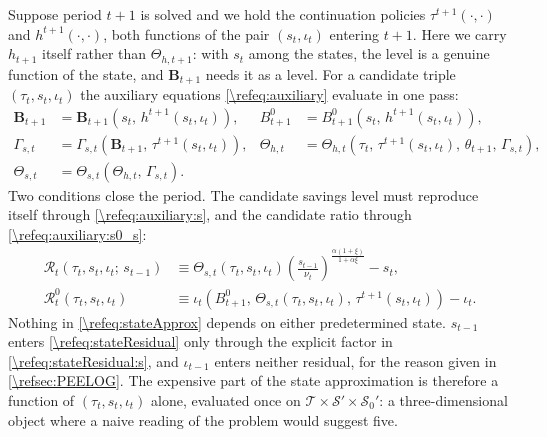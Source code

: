 Suppose period $t+1$ is solved and we hold the continuation policies $\tau^{t+1}(\cdot,\cdot)$ and $h^{t+1}(\cdot,\cdot)$, both functions of the pair $(s_t,\iota_t)$ entering $t+1$. Here we carry $h_{t+1}$ itself rather than $\Theta_{h,t+1}$: with $s_t$ among the states, the level is a genuine function of the state, and $\bm{B}_{t+1}$ needs it as a level. For a candidate triple $(\tau_t, s_t, \iota_t)$ the auxiliary equations \eqref{\refeq:auxiliary} evaluate in one pass:
\begin{subequations}\label{\refeq:stateApprox}
\begin{align}
    \bm{B}_{t+1} &= \bm{B}_{t+1}\left(s_t,\, h^{t+1}(s_t,\iota_t)\right), & B_{t+1}^0 &= B_{t+1}^0\left(s_t,\, h^{t+1}(s_t,\iota_t)\right), \label{\refeq:stateApprox:B}\\
    \Gamma_{s,t} &= \Gamma_{s,t}\left(\bm{B}_{t+1},\, \tau^{t+1}(s_t,\iota_t)\right), &
    \Theta_{h,t} &= \Theta_{h,t}\left(\tau_t,\, \tau^{t+1}(s_t,\iota_t),\, \theta_{t+1},\, \Gamma_{s,t}\right), \label{\refeq:stateApprox:Gammas}\\
    \Theta_{s,t} &= \Theta_{s,t}\left(\Theta_{h,t},\, \Gamma_{s,t}\right). \label{\refeq:stateApprox:Thetas}
\end{align}
\end{subequations}
Two conditions close the period. The candidate savings level must reproduce itself through \eqref{\refeq:auxiliary:s}, and the candidate ratio through \eqref{\refeq:auxiliary:s0_s}:
\begin{subequations}\label{\refeq:stateResidual}
\begin{align}
    \mathcal{R}_t\left(\tau_t,s_t,\iota_t;\, s_{t-1}\right) &\equiv \Theta_{s,t}\left(\tau_t,s_t,\iota_t\right)\left(\frac{s_{t-1}}{\nu_t}\right)^{\frac{\alpha(1+\xi)}{1+\alpha\xi}}-s_t, \label{\refeq:stateResidual:s}\\
    \mathcal{R}_t^0\left(\tau_t,s_t,\iota_t\right) &\equiv \iota_t\left(B_{t+1}^0,\, \Theta_{s,t}\left(\tau_t,s_t,\iota_t\right),\, \tau^{t+1}(s_t,\iota_t)\right)-\iota_t. \label{\refeq:stateResidual:iota}
\end{align}
\end{subequations}
Nothing in \eqref{\refeq:stateApprox} depends on either predetermined state. $s_{t-1}$ enters \eqref{\refeq:stateResidual} only through the explicit factor in \eqref{\refeq:stateResidual:s}, and $\iota_{t-1}$ enters neither residual, for the reason given in \cref{\refsec:PEELOG}. The expensive part of the state approximation is therefore a function of $(\tau_t,s_t,\iota_t)$ alone, evaluated once on $\mathcal{T}\times\mathcal{S}'\times\mathcal{S}_0'$: a three-dimensional object where a naive reading of the problem would suggest five.

